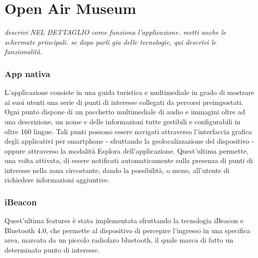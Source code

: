 \chapter*{Open Air Museum} %
\label{sommario}

\vspace{5mm}

\emph{descrivi NEL DETTAGLIO come funziona l'applicazione. metti anche le schermate principali. se dopo parli gia delle tecnologie, qui descrivi le funzionalità.} \vspace{5mm}

\subsection{App nativa}\vspace{5mm}

L’applicazione consiste in una guida turistica e multimediale in grado di mostrare ai suoi utenti una serie di punti di interesse collegati da percorsi preimpostati. Ogni punto dispone di un pacchetto multimediale di audio e immagini oltre ad una descrizione, un nome e delle informazioni tutte gestibili e configurabili in oltre 160 lingue. Tali punti possono essere navigati attraverso l’interfaccia grafica degli applicativi per smartphone - sfruttando la geolocalizzazione del dispositivo - oppure attraverso la modalità Esplora dell’applicazione. Quest'ultima permette, una volta attivata, di essere notificati automaticamente sulla presenza di punti di interesse nella zona circostante, dando la possibilità, o meno, all’utente di richiedere informazioni aggiuntive. \vspace{5mm}

\subsection{iBeacon}\vspace{5mm}

Quest’ultima features è stata implementata sfruttando la tecnologia iBeacon e Bluetooth 4.0, che permette al dispositivo di percepire l’ingresso in una specifica area, marcata da un piccolo radiofaro bluetooth, il quale marca di fatto un determinato punto di interesse.\vspace{5mm}

